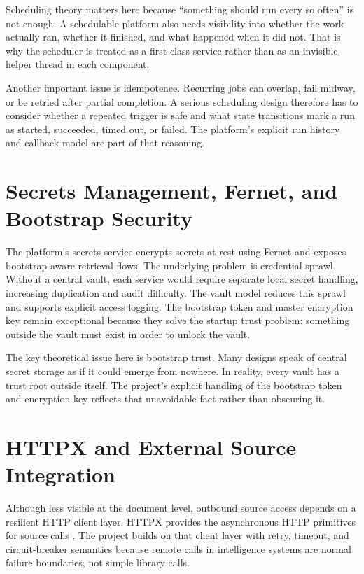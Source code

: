 Scheduling theory matters here because ``something should run every so often'' is not enough. A schedulable platform also needs visibility into whether the work actually ran, whether it finished, and what happened when it did not. That is why the scheduler is treated as a first-class service rather than as an invisible helper thread in each component.

Another important issue is idempotence. Recurring jobs can overlap, fail midway, or be retried after partial completion. A serious scheduling design therefore has to consider whether a repeated trigger is safe and what state transitions mark a run as started, succeeded, timed out, or failed. The platform's explicit run history and callback model are part of that reasoning.

\section{Secrets Management, Fernet, and Bootstrap Security}
The platform's secrets service encrypts secrets at rest using Fernet and exposes bootstrap-aware retrieval flows. The underlying problem is credential sprawl. Without a central vault, each service would require separate local secret handling, increasing duplication and audit difficulty. The vault model reduces this sprawl and supports explicit access logging. The bootstrap token and master encryption key remain exceptional because they solve the startup trust problem: something outside the vault must exist in order to unlock the vault.

The key theoretical issue here is bootstrap trust. Many designs speak of central secret storage as if it could emerge from nowhere. In reality, every vault has a trust root outside itself. The project's explicit handling of the bootstrap token and encryption key reflects that unavoidable fact rather than obscuring it.

\section{HTTPX and External Source Integration}
Although less visible at the document level, outbound source access depends on a resilient HTTP client layer. HTTPX provides the asynchronous HTTP primitives for source calls \cite{httpx_docs}. The project builds on that client layer with retry, timeout, and circuit-breaker semantics because remote calls in intelligence systems are normal failure boundaries, not simple library calls.

